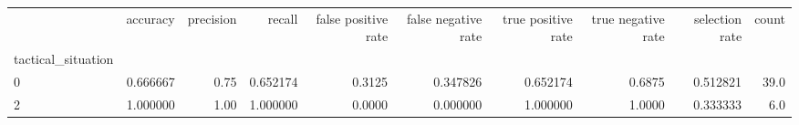 \begin{tabular}{lrrrrrrrrr}
\toprule
{} &  accuracy &  precision &    recall &  false positive rate &  false negative rate &  true positive rate &  true negative rate &  selection rate &  count \\
tactical\_situation &           &            &           &                      &                      &                     &                     &                 &        \\
\midrule
0                  &  0.666667 &       0.75 &  0.652174 &               0.3125 &             0.347826 &            0.652174 &              0.6875 &        0.512821 &   39.0 \\
2                  &  1.000000 &       1.00 &  1.000000 &               0.0000 &             0.000000 &            1.000000 &              1.0000 &        0.333333 &    6.0 \\
\bottomrule
\end{tabular}
